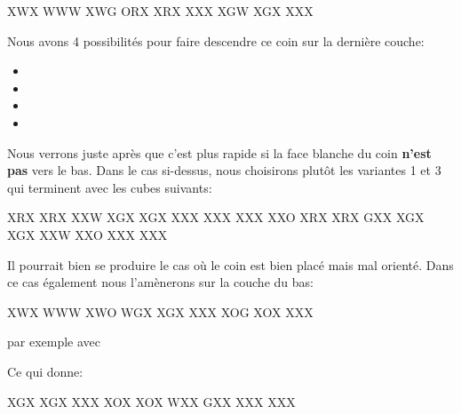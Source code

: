 \documentclass[10pt,paper=a5,pagesize]{scrbook}
\begin{document}
\begin{center}
	\RubikFaceUp%
	{X}{W}{X}%
	{W}{W}{W}%
	{X}{W}{G}
	\RubikFaceRight%
	{O}{R}{X}%
	{X}{R}{X}%
	{X}{X}{X}
	\RubikFaceFront%
	{X}{G}{W}%
	{X}{G}{X}%
	{X}{X}{X}
\end{center}

Nous avons 4 possibilités pour faire descendre ce coin sur la dernière couche:

\begin{itemize}
	\item {}
	\item {}
	\item {}
	\item {}		
\end{itemize}

Nous verrons juste après que c'est plus rapide si la face blanche du coin \textbf{n'est pas} vers le bas. Dans le cas si-dessus, nous choisirons plutôt les variantes 1 et 3 qui terminent avec les cubes suivants:

\begin{center}
	
	\RubikFaceRight%
	{X}{R}{X}%
	{X}{R}{X}%
	{X}{X}{W}
	\RubikFaceFront%
	{X}{G}{X}%
	{X}{G}{X}%
	{X}{X}{X}
		\RubikFaceDown%
		{X}{X}{X}%
		{X}{X}{X}%
		{X}{X}{O}
	\hspace*{1cm} 	
	\RubikFaceRight%
	{X}{R}{X}%
	{X}{R}{X}%
	{G}{X}{X}
	\RubikFaceFront%
	{X}{G}{X}%
	{X}{G}{X}%
	{X}{X}{W}
	\RubikFaceDown%
	{X}{X}{O}%
	{X}{X}{X}%
	{X}{X}{X}
\end{center} 

Il pourrait bien se produire le cas où le coin est bien placé mais mal orienté. Dans ce cas également nous l'amènerons sur la couche du bas:

\begin{center}
	\RubikFaceUp%
	{X}{W}{X}%
	{W}{W}{W}%
	{X}{W}{O}
	\RubikFaceRight%
	{W}{G}{X}%
	{X}{G}{X}%
	{X}{X}{X}
	\RubikFaceFront%
	{X}{O}{G}%
	{X}{O}{X}%
	{X}{X}{X}
\end{center}
 
 par exemple avec 
 
Ce qui donne:
 
\begin{center}
    \RubikFaceRight%
 	{X}{G}{X}%
 	{X}{G}{X}%
 	{X}{X}{X}
 	\RubikFaceFront%
 	{X}{O}{X}%
 	{X}{O}{X}%
 	{W}{X}{X}
 	\RubikFaceDown%
 	{G}{X}{X}%
 	{X}{X}{X}%
 	{X}{X}{X}
\end{center} 
\end{document}
